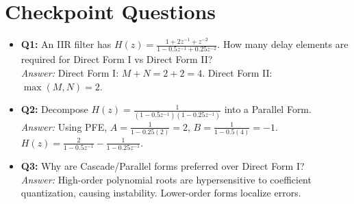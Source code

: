 \documentclass[11pt,a4paper]{article}
\begin{document}
\section{Checkpoint Questions}
\begin{itemize}
    \item \textbf{Q1:} An IIR filter has $H(z) = \frac{1 + 2z^{-1} + z^{-2}}{1 - 0.5z^{-1} + 0.25z^{-2}}$. How many delay elements are required for Direct Form I vs Direct Form II? \\
    \textit{Answer:} Direct Form I: $M+N = 2+2=4$. Direct Form II: $\max(M,N) = 2$.
    \item \textbf{Q2:} Decompose $H(z) = \frac{1}{(1 - 0.5z^{-1})(1 - 0.25z^{-1})}$ into a Parallel Form. \\
    \textit{Answer:} Using PFE, $A = \frac{1}{1 - 0.25(2)} = 2$, $B = \frac{1}{1 - 0.5(4)} = -1$. $H(z) = \frac{2}{1 - 0.5z^{-1}} - \frac{1}{1 - 0.25z^{-1}}$.
    \item \textbf{Q3:} Why are Cascade/Parallel forms preferred over Direct Form I? \\
    \textit{Answer:} High-order polynomial roots are hypersensitive to coefficient quantization, causing instability. Lower-order forms localize errors.
\end{itemize}
\end{document}

